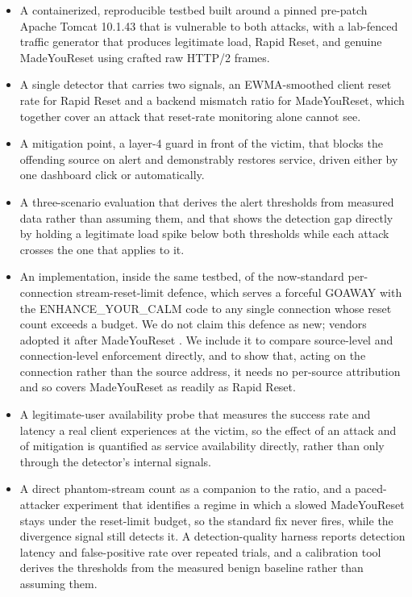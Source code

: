 \documentclass[a4paper,fleqn]{cas-dc}
\begin{document}
\begin{itemize}
  \item A containerized, reproducible testbed built around a pinned pre-patch Apache Tomcat 10.1.43 that is vulnerable to both attacks, with a lab-fenced traffic generator that produces legitimate load, Rapid Reset, and genuine MadeYouReset using crafted raw HTTP/2 frames.
  \item A single detector that carries two signals, an EWMA-smoothed client reset rate for Rapid Reset and a backend mismatch ratio for MadeYouReset, which together cover an attack that reset-rate monitoring alone cannot see.
  \item A mitigation point, a layer-4 guard in front of the victim, that blocks the offending source on alert and demonstrably restores service, driven either by one dashboard click or automatically.
  \item A three-scenario evaluation that derives the alert thresholds from measured data rather than assuming them, and that shows the detection gap directly by holding a legitimate load spike below both thresholds while each attack crosses the one that applies to it.
  \item An implementation, inside the same testbed, of the now-standard per-connection stream-reset-limit defence, which serves a forceful GOAWAY with the ENHANCE\_YOUR\_CALM code to any single connection whose reset count exceeds a budget. We do not claim this defence as new; vendors adopted it after MadeYouReset \cite{madeyouresetPaper}. We include it to compare source-level and connection-level enforcement directly, and to show that, acting on the connection rather than the source address, it needs no per-source attribution and so covers MadeYouReset as readily as Rapid Reset.
  \item A legitimate-user availability probe that measures the success rate and latency a real client experiences at the victim, so the effect of an attack and of mitigation is quantified as service availability directly, rather than only through the detector's internal signals.
  \item A direct phantom-stream count as a companion to the ratio, and a paced-attacker experiment that identifies a regime in which a slowed MadeYouReset stays under the reset-limit budget, so the standard fix never fires, while the divergence signal still detects it. A detection-quality harness reports detection latency and false-positive rate over repeated trials, and a calibration tool derives the thresholds from the measured benign baseline rather than assuming them.
\end{itemize}
\end{document}
